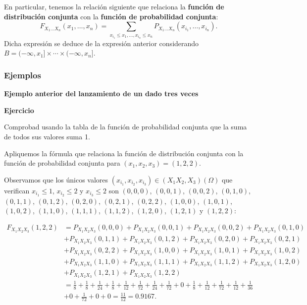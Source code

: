\documentclass[]{book}
\begin{document}
En particular, tenemos la relación siguiente que relaciona la \textbf{función de distribución conjunta} con la \textbf{función de probabilidad conjunta}:
\[
F_{X_1\ldots X_n}(x_1,\ldots,x_n)=\sum_{x_{i_1}\leq x_1,\ldots, x_{i_n}\leq x_n} P_{X_1\ldots X_n}(x_{i_1},\ldots,x_{i_n}).
\]
Dicha expresión se deduce de la expresión anterior considerando \(B=(-\infty,x_1]\times\cdots\times (-\infty,x_n]\).

\hypertarget{ejemplos-15}{%
\subsubsection{Ejemplos}\label{ejemplos-15}}

\textbf{Ejemplo anterior del lanzamiento de un dado tres veces}

\textbf{Ejercicio}

Comprobad usando la tabla de la función de probabilidad conjunta que la suma de todos sus valores suma 1.

Apliquemos la fórmula que relaciona la función de distribución conjunta con la función de probabilidad conjunta para \((x_1,x_2,x_3)=(1,2,2)\).

Observamos que los únicos valores \((x_{i_1},x_{i_2},x_{i_3})\in (X_1 X_2,X_3)(\Omega)\) que verifican \(x_{i_1}\leq 1\), \(x_{i_2}\leq 2\) y \(x_{i_3}\leq 2\) son \((0,0,0)\), \((0,0,1)\), \((0,0,2)\), \((0,1,0)\), \((0,1,1)\), \((0,1,2)\), \((0,2,0)\), \((0,2,1)\), \((0,2,2)\), \((1,0,0)\), \((1,0,1)\), \((1,0,2)\), \((1,1,0)\), \((1,1,1)\), \((1,1,2)\), \((1,2,0)\), \((1,2,1)\) y \((1,2,2)\):

\[
\begin{array}{rl}
F_{X_1X_2X_3}(1,2,2) & =P_{X_1X_2X_3}(0,0,0)+P_{X_1X_2X_3}(0,0,1)+P_{X_1X_2X_3}(0,0,2)+P_{X_1X_2X_3}(0,1,0)\\ & +P_{X_1X_2X_3}(0,1,1)+P_{X_1X_2X_3}(0,1,2)+P_{X_1X_2X_3}(0,2,0)+P_{X_1X_2X_3}(0,2,1)\\ & +P_{X_1X_2X_3}(0,2,2) +
P_{X_1X_2X_3}(1,0,0)+P_{X_1X_2X_3}(1,0,1)+P_{X_1X_2X_3}(1,0,2)\\ & +P_{X_1X_2X_3}(1,1,0)+P_{X_1X_2X_3}(1,1,1)+
P_{X_1X_2X_3}(1,1,2)+P_{X_1X_2X_3}(1,2,0)\\ & + P_{X_1X_2X_3}(1,2,1)+P_{X_1X_2X_3}(1,2,2)\\ &=
\frac{1}{8}+\frac{1}{8}+\frac{1}{24}+\frac{1}{8}+\frac{1}{12}+\frac{1}{72}+\frac{1}{24}+\frac{1}{72}+0+\frac{1}{8}+\frac{1}{12}+\frac{1}{72}+\frac{1}{12}+\frac{1}{36}\\ & +0+\frac{1}{72}+0+0=\frac{11}{12}=0.9167.
\end{array}
\]
\end{document}
